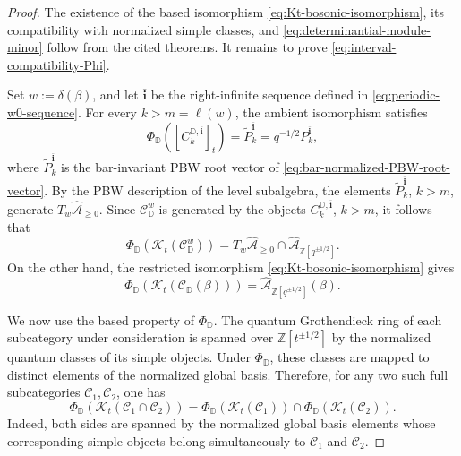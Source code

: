 \documentclass[12pt, reqno]{amsart}
\theoremstyle{plain}
\theoremstyle{definition}
\numberwithin{equation}{section}
\newcommand{\ZZ}{\mathbb{Z}}
\newcommand{\DD}{\mathbb{D}}
\newcommand{\cA}{\mathcal{A}}
\begin{document}
\begin{proof}
The existence of the based isomorphism
\eqref{eq:Kt-bosonic-isomorphism}, its compatibility with normalized
simple classes, and
\eqref{eq:determinantial-module-minor} follow from the cited
theorems. It remains to prove
\eqref{eq:interval-compatibility-Phi}.

Set \(w:=\delta(\beta)\), and let
\(\overline{\mathbf i}\) be the right-infinite sequence defined in
\eqref{eq:periodic-w0-sequence}. For every \(k>m=\ell(w)\), the
ambient isomorphism satisfies
\begin{equation}\label{eq:fundamental-module-PBW-vector}
    \Phi_{\DD}
    \left(
        [C_k^{\DD,\overline{\mathbf i}}]_t
    \right)
    =
    \widetilde P_k^{\overline{\mathbf i}}
    =q^{-1/2}P_k^{\overline{\mathbf i}},
\end{equation}
where \(\widetilde P_k^{\overline{\mathbf i}}\) is the bar-invariant
PBW root vector of \eqref{eq:bar-normalized-PBW-root-vector}.
By the PBW description of the level subalgebra, the elements
\(\widetilde P_k^{\overline{\mathbf i}}\), \(k>m\), generate
\(T_w\widehat{\cA}_{\geq0}\). Since
\(\mathscr C_{\DD}^{w}\) is generated by the objects
\(C_k^{\DD,\overline{\mathbf i}}\), \(k>m\), it follows that
\begin{equation}\label{eq:image-level-subcategory}
    \Phi_{\DD}
    \left(
        \mathcal{K}_t(\mathscr C_{\DD}^{w})
    \right)
    =
    T_w\widehat{\cA}_{\geq0}\cap\widehat{\cA}_{\ZZ[q^{\pm1/2}]}.
\end{equation}
On the other hand, the restricted isomorphism
\eqref{eq:Kt-bosonic-isomorphism} gives
\begin{equation}\label{eq:image-beta-category}
    \Phi_{\DD}
    \left(
        \mathcal{K}_t(\mathscr C_{\DD}(\beta))
    \right)
    =
    \widehat{\cA}_{\ZZ[q^{\pm1/2}]}(\beta).
\end{equation}

We now use the based property of \(\Phi_{\DD}\). The quantum
Grothendieck ring of each subcategory under consideration is spanned
over \(\ZZ[t^{\pm1/2}]\) by the normalized quantum classes of its
simple objects. Under \(\Phi_{\DD}\), these classes are mapped to
distinct elements of the normalized global basis. Therefore, for any
two such full subcategories \(\mathscr C_1,\mathscr C_2\), one has
\begin{equation}\label{eq:based-intersection-property}
    \Phi_{\DD}\!\left(
        \mathcal{K}_t(\mathscr C_1\cap\mathscr C_2)
    \right)
    =
    \Phi_{\DD}\!\left(\mathcal{K}_t(\mathscr C_1)\right)
    \cap
    \Phi_{\DD}\!\left(\mathcal{K}_t(\mathscr C_2)\right).
\end{equation}
Indeed, both sides are spanned by the normalized global basis
elements whose corresponding simple objects belong simultaneously
to \(\mathscr C_1\) and \(\mathscr C_2\).


\end{proof}
\end{document}
